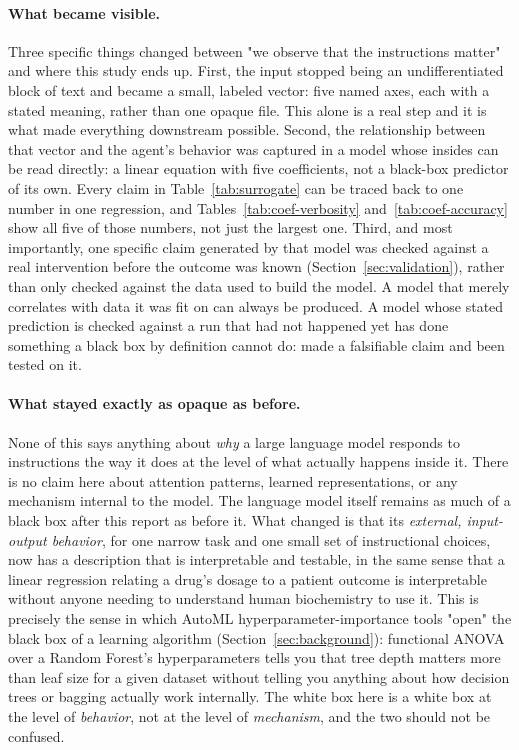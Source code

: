 \documentclass[11pt]{article}
\begin{document}
\paragraph{What became visible.} Three specific things changed between "we observe that the instructions matter" and where this study ends up. First, the input stopped being an undifferentiated block of text and became a small, labeled vector: five named axes, each with a stated meaning, rather than one opaque file. This alone is a real step and it is what made everything downstream possible. Second, the relationship between that vector and the agent's behavior was captured in a model whose insides can be read directly: a linear equation with five coefficients, not a black-box predictor of its own. Every claim in Table~\ref{tab:surrogate} can be traced back to one number in one regression, and Tables~\ref{tab:coef-verbosity} and~\ref{tab:coef-accuracy} show all five of those numbers, not just the largest one. Third, and most importantly, one specific claim generated by that model was checked against a real intervention before the outcome was known (Section~\ref{sec:validation}), rather than only checked against the data used to build the model. A model that merely correlates with data it was fit on can always be produced. A model whose stated prediction is checked against a run that had not happened yet has done something a black box by definition cannot do: made a falsifiable claim and been tested on it.

\paragraph{What stayed exactly as opaque as before.} None of this says anything about \emph{why} a large language model responds to instructions the way it does at the level of what actually happens inside it. There is no claim here about attention patterns, learned representations, or any mechanism internal to the model. The language model itself remains as much of a black box after this report as before it. What changed is that its \emph{external, input-output behavior}, for one narrow task and one small set of instructional choices, now has a description that is interpretable and testable, in the same sense that a linear regression relating a drug's dosage to a patient outcome is interpretable without anyone needing to understand human biochemistry to use it. This is precisely the sense in which AutoML hyperparameter-importance tools "open" the black box of a learning algorithm (Section~\ref{sec:background}): functional ANOVA over a Random Forest's hyperparameters tells you that tree depth matters more than leaf size for a given dataset without telling you anything about how decision trees or bagging actually work internally. The white box here is a white box at the level of \emph{behavior}, not at the level of \emph{mechanism}, and the two should not be confused.
\end{document}
